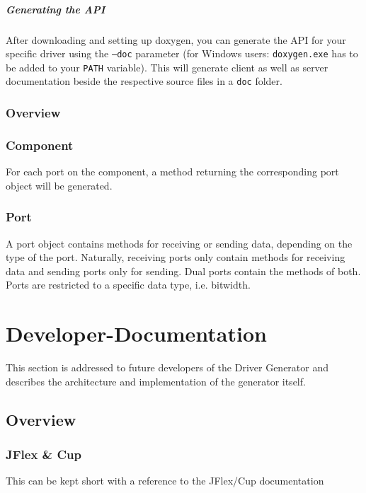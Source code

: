 \documentclass{report}
\begin{document}
\paragraph{Generating the API}

After downloading and setting up doxygen, you can generate the API for your specific driver using the \texttt{--doc} parameter (for Windows users: \texttt{doxygen.exe} has to be added to your \texttt{PATH} variable). This will generate client as well as server documentation beside the respective source files in a \texttt{doc} folder.

\subsection{Overview}

\subsection{Component}
For each port on the component, a method returning the corresponding port object will be generated.

\subsection{Port}
A port object contains methods for receiving or sending data, depending on the type of the port. Naturally, receiving ports only contain methods for receiving data and sending ports only for sending. Dual ports contain the methods of both. Ports are restricted to a specific data type, i.e. bitwidth.

\chapter{Developer-Documentation}
\label{sec:devDoc}
This section is addressed to future developers of the Driver Generator and describes the architecture and implementation of the generator itself.

\section{Overview}

\subsection{JFlex \& Cup}
This can be kept short with a reference to the JFlex/Cup documentation
\end{document}
